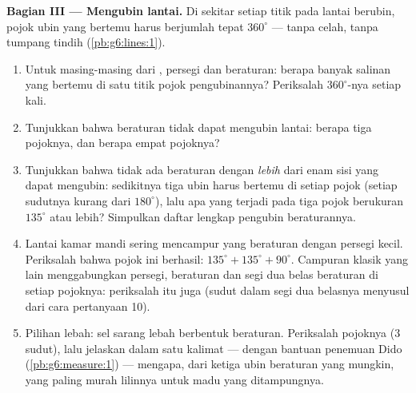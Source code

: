 \begin{problem}
\medskip
\noindent\textbf{Bagian III --- Mengubin lantai.}
Di sekitar setiap titik pada lantai berubin, pojok ubin yang bertemu
harus berjumlah tepat $360^\circ$ --- tanpa celah, tanpa tumpang
tindih (\cref{pb:g6:lines:1}).
\begin{enumerate}[resume]
  \item Untuk masing-masing dari , persegi dan  beraturan: berapa banyak salinan yang bertemu di satu
        titik pojok pengubinannya? Periksalah $360^\circ$-nya setiap
        kali.
  \item Tunjukkan bahwa  beraturan tidak dapat mengubin
        lantai: berapa  tiga pojoknya, dan berapa  empat
        pojoknya?
  \item Tunjukkan bahwa tidak ada  beraturan dengan
        \emph{lebih} dari enam sisi yang dapat mengubin: sedikitnya
        tiga ubin harus bertemu di setiap pojok (setiap sudutnya
        kurang dari $180^\circ$), lalu apa yang terjadi pada tiga
        pojok berukuran $135^\circ$ atau lebih? Simpulkan daftar
        lengkap pengubin beraturannya.
  \item Lantai kamar mandi sering mencampur  yang
        beraturan dengan persegi kecil. Periksalah bahwa pojok ini berhasil:
        $135^\circ + 135^\circ + 90^\circ$. Campuran klasik yang lain
        menggabungkan persegi,  beraturan dan segi dua belas
        beraturan di setiap pojoknya: periksalah itu juga (sudut dalam
        segi dua belasnya menyusul dari cara pertanyaan 10).
  \item Pilihan lebah: sel sarang lebah berbentuk  beraturan.
        Periksalah pojoknya ($3$ sudut), lalu jelaskan dalam satu
        kalimat --- dengan bantuan penemuan Dido
        (\cref{pb:g6:measure:1}) --- mengapa, dari ketiga ubin
        beraturan yang mungkin,  yang paling murah
        lilinnya untuk madu yang ditampungnya.

\end{enumerate}
\end{problem}
